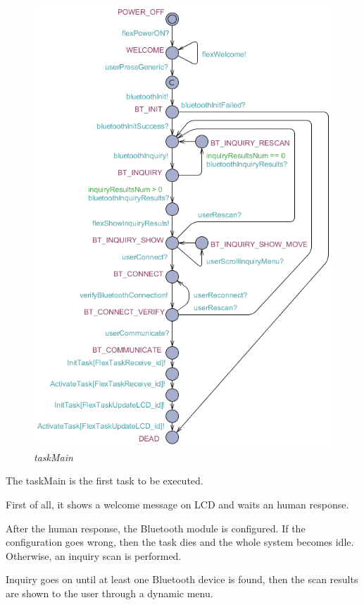 \documentclass[paper=a4, fontsize=11pt]{scrartcl} %
\numberwithin{equation}{section} %
\numberwithin{figure}{section} %
\numberwithin{table}{section} %
\begin{document}
\begin{figure}[H]
  \centering
  \includegraphics[width=5.7in]{img/FLEX-OBD-LCD_taskMain}
  \caption{\textit{taskMain}}
\end{figure}

The taskMain is the first task to be executed.

First of all, it shows a welcome message on LCD and waits an human response.

After the human response, the Bluetooth module is configured. If the configuration goes wrong, then the task dies and the whole system becomes idle. Otherwise, an inquiry scan is performed.

Inquiry goes on until at least one Bluetooth device is found, then the scan results are shown to the user through a dynamic menu.
\end{document}
